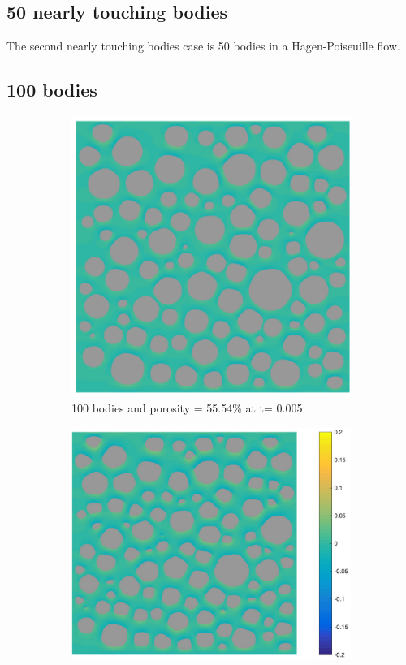\documentclass[preprint, 10pt]{elsarticle}
\begin{document}
\subsection{50 nearly touching bodies}
{\color{red}
The second nearly touching bodies case is 50 bodies in a Hagen-Poiseuille flow.
}

\subsection{100 bodies}
\begin{figure}[H]
 \begin{subfigure}[b]{0.5\textwidth}
\includegraphics*[width =0.9\linewidth]{./figs/100b_50}
\caption{100 bodies and porosity = 55.54\% at t= 0.005}
\end{subfigure}%
\begin{subfigure}[b]{0.5\textwidth}
\includegraphics*[width =1.1\linewidth]{./figs/100b_100}

\end{subfigure}
\end{figure}
\end{document}
